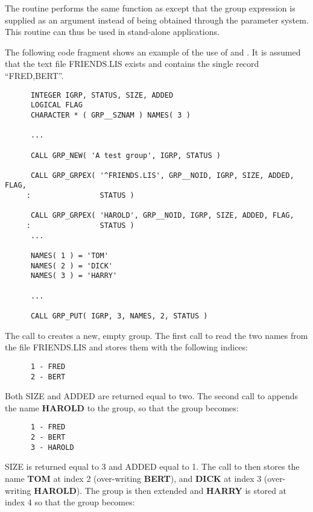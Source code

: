 The routine  performs the same function as  except
that the group expression is supplied as an argument instead of being
obtained through the parameter system. This routine can thus be used in
stand-alone applications.

The following code fragment shows an example of the use of  and
. It is assumed that the text file FRIENDS.LIS exists and contains the
single record ``FRED,BERT''.

\small
\begin{verbatim}
      INTEGER IGRP, STATUS, SIZE, ADDED
      LOGICAL FLAG
      CHARACTER * ( GRP__SZNAM ) NAMES( 3 )

      ...

      CALL GRP_NEW( 'A test group', IGRP, STATUS )

      CALL GRP_GRPEX( '^FRIENDS.LIS', GRP__NOID, IGRP, SIZE, ADDED, FLAG,
     :                STATUS )

      CALL GRP_GRPEX( 'HAROLD', GRP__NOID, IGRP, SIZE, ADDED, FLAG,
     :                STATUS )
      ...

      NAMES( 1 ) = 'TOM'
      NAMES( 2 ) = 'DICK'
      NAMES( 3 ) = 'HARRY'

      ...

      CALL GRP_PUT( IGRP, 3, NAMES, 2, STATUS )
\end{verbatim}
\normalsize

The call to  creates a new, empty group. The first call to 
read the two names from the file FRIENDS.LIS and stores them with the following
indices:

\small
\begin{verbatim}
      1 - FRED
      2 - BERT
\end{verbatim}
\normalsize

Both SIZE and ADDED are returned equal to two. The second call to 
appends the name {\bf HAROLD} to the group, so that the group becomes:

\small
\begin{verbatim}
      1 - FRED
      2 - BERT
      3 - HAROLD
\end{verbatim}
\normalsize

SIZE is returned equal to 3 and ADDED equal to 1. The call to 
then stores the name {\bf TOM} at index 2 (over-writing {\bf BERT}), and {\bf
DICK} at index 3 (over-writing {\bf HAROLD}). The group is then extended and
{\bf HARRY} is stored at index 4 so that the group becomes:

